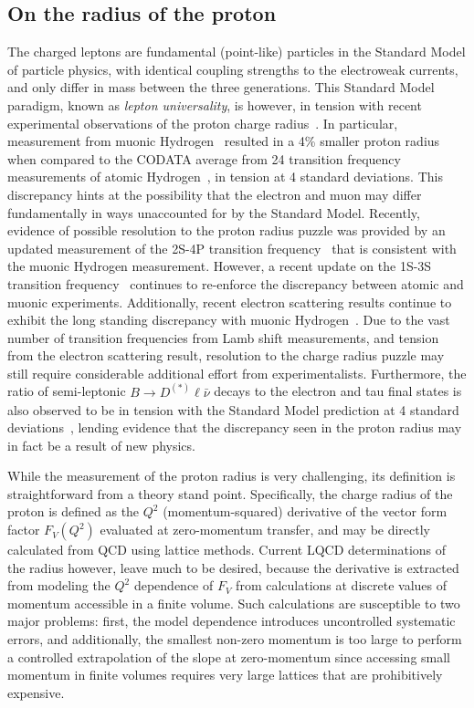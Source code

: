 \documentclass[prd,aps,twocolumn,superscriptaddress,tightenlines,nofootinbib,floatfix,preprintnumbers,10pt]{revtex4-1}
\begin{document}
\subsection{On the radius of the proton}
The charged leptons are fundamental (point-like) particles in the Standard Model of particle physics, with identical coupling strengths to the electroweak currents, and only differ in mass between the three generations. This Standard Model paradigm, known as \textit{lepton universality}, is however, in tension with recent experimental observations of the proton charge radius~\cite{Carlson:2015jba}. In particular, measurement from muonic Hydrogen~\cite{nature09250} resulted in a 4\% smaller proton radius when compared to the CODATA average from 24 transition frequency measurements of atomic Hydrogen~\cite{RevModPhys.80.633}, in tension at 4 standard deviations. This discrepancy hints at the possibility that the electron and muon may differ fundamentally in ways unaccounted for by the Standard Model. Recently, evidence of possible resolution to the proton radius puzzle was provided by an updated measurement of the 2S-4P transition frequency~\cite{Beyer79} that is consistent with the muonic Hydrogen measurement. However, a recent update on the 1S-3S transition frequency~\cite{fleurbaey:tel-01633631} continues to re-enforce the discrepancy between atomic and muonic experiments. Additionally, recent electron scattering results continue to exhibit the long standing discrepancy with muonic Hydrogen~\cite{Sick:2018fzn}. Due to the vast number of transition frequencies from Lamb shift measurements, and tension from the electron scattering result, resolution to the charge radius puzzle may still require considerable additional effort from experimentalists. Furthermore, the ratio of semi-leptonic $B\rightarrow D^{(*)}\ell\bar{\nu}$ decays to the electron and tau final states is also observed to be in tension with the Standard Model prediction at 4 standard deviations~\cite{Ciezarek:2017yzh}, lending evidence that the discrepancy seen in the proton radius may in fact be a result of new physics.

While the measurement of the proton radius is very challenging, its definition is straightforward from a theory stand point. Specifically, the charge radius of the proton is defined as the $Q^2$ (momentum-squared) derivative of the vector form factor $F_V(Q^2)$ evaluated at zero-momentum transfer, and may be directly calculated from QCD using lattice methods. Current LQCD determinations of the radius however, leave much to be desired, because the derivative is extracted from modeling the $Q^2$ dependence of $F_V$ from calculations at discrete values of momentum accessible in a finite volume. Such calculations are susceptible to two major problems: first, the model dependence introduces uncontrolled systematic errors, and additionally, the smallest non-zero momentum is too large to perform a controlled extrapolation of the slope at zero-momentum since accessing small momentum in finite volumes requires very large lattices that are prohibitively expensive.
\end{document}
